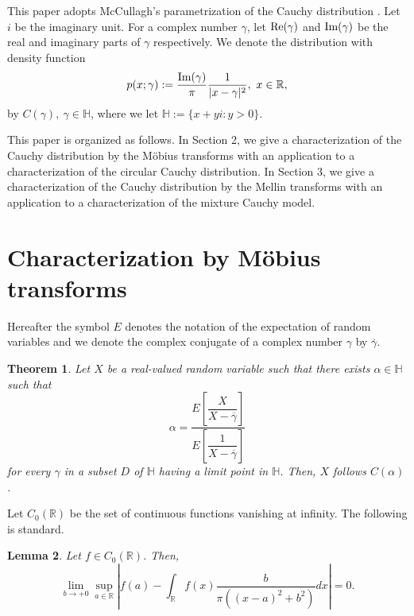 \documentclass[a4paper, reqno, 11pt]{amsart}
\newtheorem{Thm}{Theorem}[section]
\newtheorem{Lem}[Thm]{Lemma}
\theoremstyle{definition}
\begin{document}
This paper adopts McCullagh's parametrization of the Cauchy distribution \cite{McCullagh1996}. 
Let $i$ be the imaginary unit.
For a complex number $\gamma$, let $\textup{Re}(\gamma)$ and $\textup{Im}(\gamma)$ be the real and imaginary parts of $\gamma$ respectively. 
We denote the distribution with density function 
\[ p(x; \gamma) := \frac{\textup{Im}(\gamma)}{\pi} \frac{1}{|x - \gamma|^2}, \ x \in \mathbb{R},    \]
by $C(\gamma), \ \gamma \in \mathbb{H}$, where we let $\mathbb{H} := \{x+yi : y > 0\}$. 


This paper is organized as follows. 
In Section 2, we give a characterization of the Cauchy distribution by the M\"obius transforms with an application to a characterization of the circular Cauchy distribution. 
In Section 3, we give a characterization of the Cauchy distribution by the Mellin transforms with an application to a characterization of the mixture Cauchy model.

\section{Characterization by M\"obius transforms}

Hereafter the symbol $E$ denotes the notation of the expectation of random variables and we denote the complex conjugate of a complex number $\gamma$ by $\overline{\gamma}$. %

\begin{Thm}\label{Mobius}
Let $X$ be a real-valued random variable such that there exists  $\alpha \in \mathbb{H}$ such that  
\[ \alpha = \frac{E\left[\dfrac{X}{X - \overline{\gamma}}\right]}{E\left[\dfrac{1}{X - \overline{\gamma}}\right]}\]
for every $\gamma$ in a subset $D$ of $\mathbb{H}$ having a limit point in $\mathbb{H}$.
Then, 
$X$ follows $C(\alpha)$.  
\end{Thm}


Let $C_0 (\mathbb{R})$ be the set of continuous functions vanishing at infinity. 
The following is standard. 
\begin{Lem}\label{Cc}
Let $f \in C_0 (\mathbb{R})$. 
Then, 
\[ \lim_{b \to +0} \sup_{a \in \mathbb{R}} \left| f(a) - \int_{\mathbb{R}} f(x) \frac{b}{\pi((x-a)^2 + b^2)} dx \right| = 0.   \]
\end{Lem}
\end{document}
